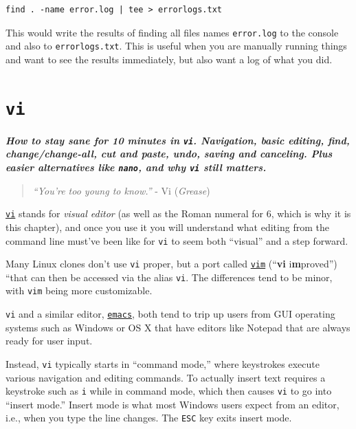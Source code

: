 \documentclass[10pt,]{book}
\numberwithin{figure}{chapter}
\begin{document}
\begin{verbatim}
find . -name error.log | tee > errorlogs.txt
\end{verbatim}

This would write the results of finding all files names
\texttt{error.log} to the console and also to \texttt{errorlogs.txt}.
This is useful when you are manually running things and want to see the
results immediately, but also want a log of what you did.

\chapter{\texttt{vi}}\label{vi}

\textbf{\emph{How to stay sane for 10 minutes in \texttt{vi}.
Navigation, basic editing, find, change/change-all, cut and paste, undo,
saving and canceling. Plus easier alternatives like \texttt{nano}, and
why \texttt{vi} still matters.}}

\begin{quote}
\emph{``You're too young to know.''} - Vi (\emph{Grease})
\end{quote}

\href{http://linux.die.net/man/1/vi}{\texttt{vi}} stands for
\emph{visual editor} (as well as the Roman numeral for 6, which is why
it is this chapter), and once you use it you will understand what
editing from the command line must've been like for \texttt{vi} to seem
both ``visual'' and a step forward.

Many Linux clones don't use \texttt{vi} proper, but a port called
\href{http://www.vim.org/}{\texttt{vim}} (``\textbf{vi}
i\textbf{m}proved'') ``that can then be accessed via the alias
\texttt{vi}. The differences tend to be minor, with \texttt{vim} being
more customizable.

\texttt{vi} and a similar editor,
\href{http://linux.die.net/man/1/emacs}{\texttt{emacs}}, both tend to
trip up users from GUI operating systems such as Windows or OS X that
have editors like Notepad that are always ready for user input.

Instead, \texttt{vi} typically starts in ``command mode,'' where
keystrokes execute various navigation and editing commands. To actually
insert text requires a keystroke such as \texttt{i} while in command
mode, which then causes \texttt{vi} to go into ``insert mode.'' Insert
mode is what most Windows users expect from an editor, i.e., when you
type the line changes. The \texttt{ESC} key exits insert mode.
\end{document}

